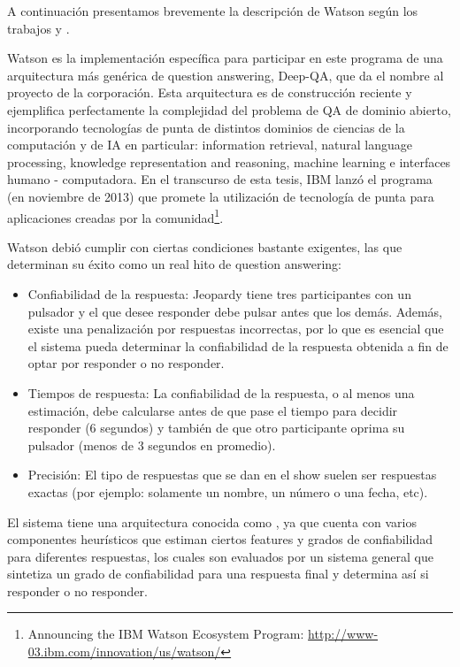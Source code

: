\medskip

A continuación presentamos brevemente la descripción de Watson según los trabajos \cite{WATSON1} y \cite{WATSON2}.

\medskip

Watson es la implementación específica para participar en este
programa de una arquitectura más genérica de question answering,
Deep-QA, que da el nombre al proyecto de la corporación. Esta
arquitectura es de construcción reciente y ejemplifica perfectamente la complejidad del problema de
QA de dominio abierto, incorporando tecnologías de punta de distintos
dominios de ciencias de la computación y de IA en particular:
information retrieval, natural language processing, knowledge
representation and reasoning, machine learning e interfaces humano -
computadora. En el transcurso de esta tesis, IBM lanzó el programa
 (en noviembre de 2013) que promete la utilización
de tecnología de punta para aplicaciones creadas por la comunidad\footnote{
Announcing the IBM Watson Ecosystem Program: \url{http://www-03.ibm.com/innovation/us/watson/}}.

Watson debió cumplir con ciertas condiciones bastante exigentes, las que determinan su éxito como un real hito de question answering:


\begin{itemize}
\item Confiabilidad de la respuesta: \newline
Jeopardy tiene tres participantes con un pulsador y el que desee
responder debe pulsar antes que los demás. Además, existe una
penalización por respuestas incorrectas, por lo que es esencial que
el sistema pueda determinar la confiabilidad de la respuesta obtenida a
fin de optar por responder o no responder.
\item Tiempos de respuesta: \newline
La confiabilidad de la respuesta, o al menos una estimación, debe
calcularse antes de que pase el tiempo para decidir responder (6
segundos) y también de que otro participante oprima su pulsador
(menos de 3 segundos en promedio).
\item Precisión:\newline
El tipo de respuestas que se dan en el show suelen ser respuestas
exactas (por ejemplo: solamente un nombre, un número o una fecha,
etc).
\end{itemize}

\bigskip

El sistema tiene una arquitectura conocida como , ya que cuenta con varios componentes heurísticos que estiman
ciertos features y grados de confiabilidad para diferentes respuestas, los cuales son evaluados por un sistema general que sintetiza un grado
de confiabilidad para una respuesta final y determina así si responder o no responder.

